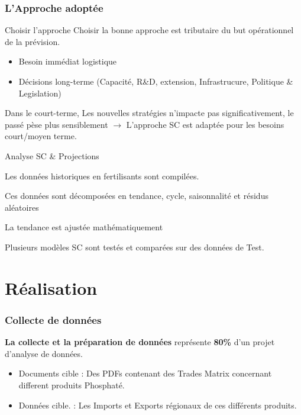 \documentclass{beamer}
\begin{document}
	\begin{frame}
	\frametitle{L'Approche adoptée}
	
	\begin{block}{Choisir l'approche}
	\scriptsize{Choisir la bonne approche est tributaire du but opérationnel de la prévision.}
	\footnotesize{
	\begin{itemize}
	\item Besoin immédiat logistique
	\item Décisions long-terme (Capacité, R\&D, extension, Infrastrucure, Politique \& Legislation)
	\end{itemize}}
	\scriptsize{Dans le court-terme, Les nouvelles stratégies n'impacte pas significativement, le passé pèse plus sensiblement $\rightarrow$  L'approche SC est adaptée pour les besoins court/moyen terme.}
	\end{block}
	\begin{block}{Analyse SC \& Projections}
	\begin{itemize}
	\scriptsize{\item Les données historiques en fertilisants sont compilées.
	\item Ces données sont décomposées en tendance, cycle, saisonnalité et résidus aléatoires 
	\item La tendance est ajustée mathématiquement 
	\item Plusieurs modèles SC sont testés et comparées sur des données de Test.}
	\end{itemize}
	\end{block}
	\end{frame}

\section{Réalisation}

\begin{frame}
  \frametitle{Collecte de données}
  \textbf{La collecte et la préparation de données} représente \textbf{80\%} d'un projet d'analyse de données.\\
  \begin{itemize}
    \item Documents cible : Des PDFs contenant des Trades Matrix concernant different produits Phosphaté.
    \item Données cible. : Les Imports et Exports régionaux de ces différents produits.
  \end{itemize}
\end{frame}
\end{document}
